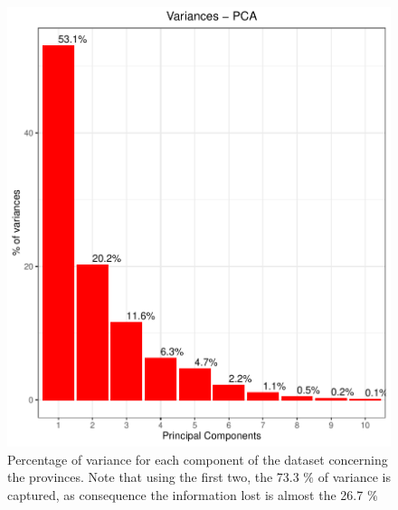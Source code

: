 \documentclass[
12pt, %
a4paper, %
oneside, %
headinclude,footinclude, %
BCOR5mm, %
]{scrartcl}
\begin{document}
\begin{figure}[h]
\begin{center}
\includegraphics[scale=1]{Pic/Region_variances.pdf}
\caption{Percentage of variance for each component of the dataset concerning the provinces. Note that using the first two, the 73.3 $\% $ of variance is captured, as consequence the information lost is almost the 26.7 $\%$}
\label{Region_variances}
\end{center}
\end{figure}
\end{document}

